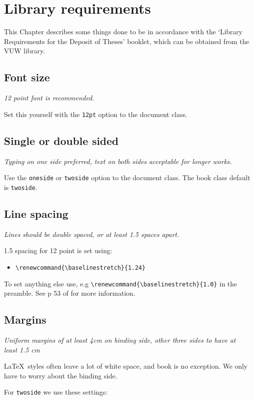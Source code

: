 \chapter{Library requirements}\label{C:lib}

This Chapter describes some things done to be in accordance with the `Library Requirements for the Deposit of Theses' booklet, which can be obtained from the VUW library.

\section{Font size}
\textit{12 point font is recommended.} 

Set this yourself with the \verb+12pt+ option to the document class.

\section{Single or double sided}
\textit{Typing on one side preferred, text on both sides acceptable for longer works.} 

Use the \verb+oneside+ or \verb+twoside+ option to the document class. The \textsf{book} class default is \verb+twoside+.


\section{Line spacing}
\textit{Lines should be double spaced, or at least 1.5 spaces apart.} 

1.5 spacing for 12 point is set using:
\begin{itemize}
\item \verb+\renewcommand{\baselinestretch}{1.24}+  
\end{itemize}

To set anything else use, e.g  \verb+\renewcommand{\baselinestretch}{1.0}+ in the preamble. See p 53 of \cite{GMS94} for more information.


\section{Margins}
\textit{Uniform margins of at least 4cm on binding side, other three sides to have at least 1.5 cm}

\LaTeX\ styles often leave a lot of white space, and \textsf{book} is no exception. We only have to worry about the binding side.

For \verb+twoside+ we use these settings:
\setlength{\textheight}{19.8cm}
\setlength{\oddsidemargin}{1.46cm}
\setlength{\evensidemargin}{0.83cm}

